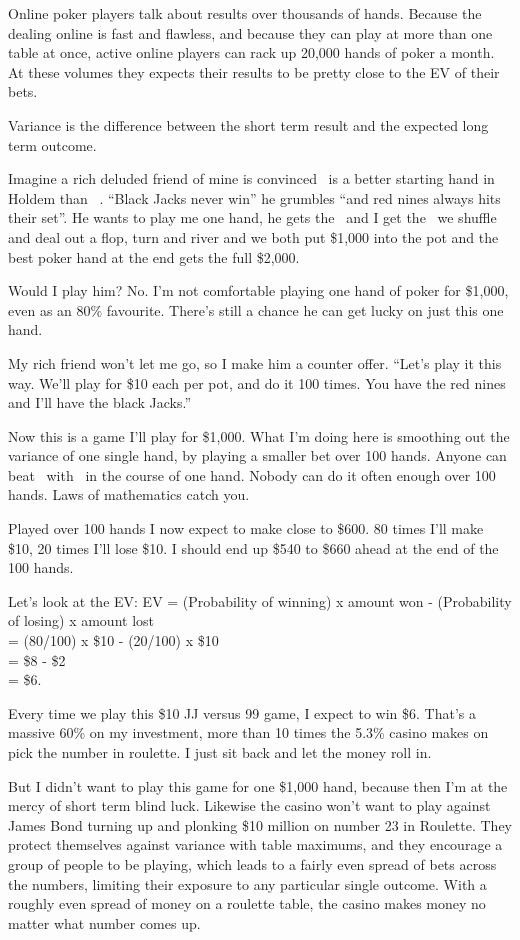 Online poker players talk about results over thousands of hands. Because the
dealing online is fast and flawless, and because they can play at
more than one table at once, active online players can rack up
20,000 hands of poker a month. At these volumes they expects their
results to be pretty close to the EV of their bets.

Variance is the difference between the short term result and the
expected long term outcome.

Imagine a rich deluded friend of mine is convinced \nineh\nined\ is a better
starting hand in Holdem than \Jc\Js\ . ``Black Jacks never win'' he grumbles
``and red nines always hits their set''. He wants to play me one hand, he
gets the \nineh\nined\ and I get the \Jc\Js\, we shuffle and deal out a flop,
turn and river and we both put \$1,000 into the pot and the best
poker hand at the end gets the full \$2,000.

Would I play him? No. I'm not comfortable playing one hand of poker
for \$1,000, even as an 80\% favourite. There's still a chance he can get
lucky on just this one hand.

My rich friend won't let me go, so I make him a counter offer.
``Let's play it this way. We'll play for \$10 each per pot, and do
it 100 times. You have the red nines and I'll have the black Jacks.''

Now this is a game I'll play for \$1,000. What I'm doing here is smoothing
out the variance of one single hand, by playing a smaller bet over
100 hands. Anyone can beat \Jc\Js\ with \nineh\nined\ in the course of one
hand. Nobody can do it often enough over 100 hands. Laws of mathematics
catch you.

Played over 100 hands I now expect to make close to \$600. 80 times I'll
make \$10, 20 times I'll lose \$10. I should end up \$540 to \$660 ahead
at the end of the 100 hands.

Let's look at the EV:
EV = (Probability of winning) x amount won - (Probability of losing) x
amount lost \\
   = (80/100) x \$10 - (20/100) x \$10 \\
   = \$8 - \$2 \\
   = \$6.

Every time we play this \$10 JJ versus 99 game, I expect to win \$6. That's a
massive 60\% on my investment, more than 10 times the 5.3\% casino makes on
pick the number in roulette. I just sit back and let the money roll in.

But I didn't want to play this game for one \$1,000 hand, because then
I'm at the mercy of short term blind luck. Likewise the casino won't
want to play against James Bond turning up and plonking \$10 million
on number 23 in Roulette. They protect themselves against variance
with table maximums, and they encourage a group of people to be playing,
which leads to a fairly even spread of bets across the numbers, limiting
their exposure to any particular single outcome. With a roughly even spread
of money on a roulette table, the casino makes money no matter what
number comes up.

